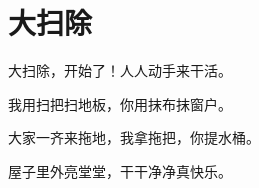 \documentclass[12pt,UTF-8,openany]{ctexbook}
\begin{document}
\hanzibox{}\hanzibox{}\hanzibox{}\hanzibox{}\hspace{1em}\hanzibox{}\hanzibox{}\hanzibox{}\hanzibox{}

\hanzibox{}\hanzibox{}\hanzibox{}\hanzibox{}\hspace{1em}\hanzibox{}\hanzibox{}\hanzibox{}\hanzibox{}

\hanzibox{}\hanzibox{}\hanzibox{}\hanzibox{}\hspace{1em}\hanzibox{}\hanzibox{}\hanzibox{}\hanzibox{}






\chapter{大扫除}

\begin{large}
    
    大扫除，开始了！人人动手来干活。
    
    我用扫把扫地板，你用抹布抹窗户。
    
    大家一齐来拖地，我拿拖把，你提水桶。
    
    屋子里外亮堂堂，干干净净真快乐。
    
\end{large}


\clearpage

\begin{center}
    
    
\end{center}


\hanzibox{}\hanzibox{}\hanzibox{}\hanzibox{}\hspace{1em}\hanzibox{}\hanzibox{}\hanzibox{}\hanzibox{}

\hanzibox{}\hanzibox{}\hanzibox{}\hanzibox{}\hspace{1em}\hanzibox{}\hanzibox{}\hanzibox{}\hanzibox{}

\hanzibox{}\hanzibox{}\hanzibox{}\hanzibox{}\hspace{1em}\hanzibox{}\hanzibox{}\hanzibox{}\hanzibox{}
\end{document}
